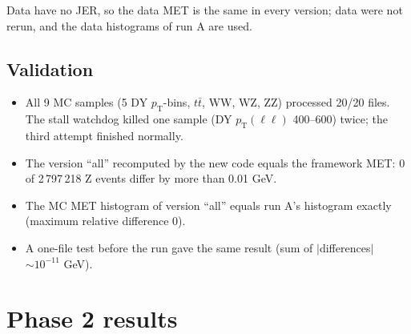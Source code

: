 \documentclass[11pt,a4paper]{article}
\newcommand{\pt}{$p_\mathrm{T}$}
\begin{document}
Data have no JER, so the data MET is the same in every version; data were not rerun, and the data histograms of run A are used.

\subsection{Validation}
\begin{itemize}
\item All 9 MC samples (5 DY \pt-bins, $t\bar t$, WW, WZ, ZZ) processed 20/20 files. The stall watchdog killed one sample
(DY $p_\mathrm{T}(\ell\ell)$ 400--600) twice; the third attempt finished normally.
\item The version ``all'' recomputed by the new code equals the framework MET: 0 of 2\,797\,218 Z events differ by more than 0.01 GeV.
\item The MC MET histogram of version ``all'' equals run A's histogram exactly (maximum relative difference 0).
\item A one-file test before the run gave the same result (sum of $|$differences$|$ $\sim 10^{-11}$ GeV).
\end{itemize}

\section{Phase 2 results}
\label{sec:p2res}
\end{document}
